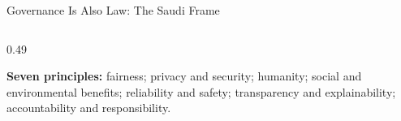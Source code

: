 
\begin{frame}{Governance Is Also Law: The Saudi Frame}

    \begin{columns}[T]
        \begin{column}{0.49\textwidth}
            \begin{tcolorbox}[colback=raiBlue!5, colframe=raiBlue!60,
                              title={SDAIA AI Ethics Principles (2023)}]
                \scriptsize
                \textbf{Seven principles:} fairness; privacy and security; humanity; social and
                environmental benefits; reliability and safety; transparency and explainability;
                accountability and responsibility.


\end{tcolorbox}
\end{column}
\end{columns}
\end{frame}
